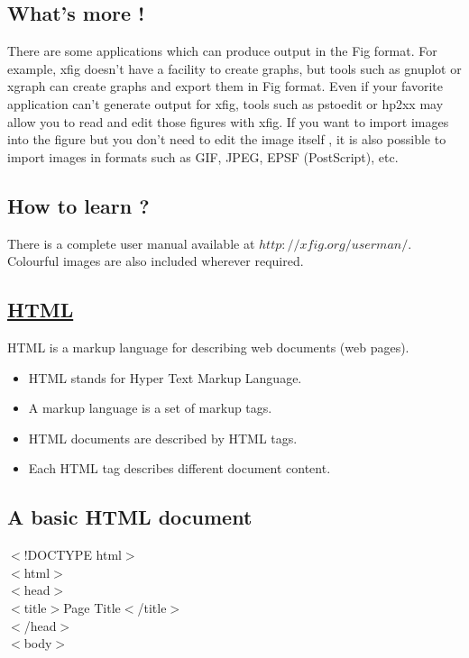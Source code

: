 \documentclass[a4paper, 12pt]{article}
\begin{document}
\subsection{What's more !}
There are some applications which can produce output in the Fig format. For example, xfig doesn't have a facility to create graphs, but tools such as gnuplot or xgraph can create graphs and export them in Fig format. Even if your favorite application can't generate output for xfig, tools such as pstoedit or hp2xx may allow you to read and edit those figures with xfig. If you want to import images into the figure but you don't need to edit the image itself , it is also possible to import images in formats such as GIF, JPEG, EPSF (PostScript), etc.

\subsection{How to learn ?}
There is a complete user manual available at $http://xfig.org/userman/$. Colourful images are also included wherever required.

\begin{center}
\section{\underline{HTML}}
\end{center}
HTML is a markup language for describing web documents (web pages). \\
	\begin{itemize}
	\item HTML stands for Hyper Text Markup Language.
	\item A markup language is a set of markup tags.
	\item HTML documents are described by HTML tags.
	\item Each HTML tag describes different document content.
	\end{itemize}

\newpage

\subsection{A basic HTML document}
$<$!DOCTYPE html$>$ \\
$<$html$>$ \\
$<$head$>$ \\
$<$title$>$Page Title$<$/title$>$ \\
$<$/head$>$ \\
$<$body$>$ \\
\end{document}
